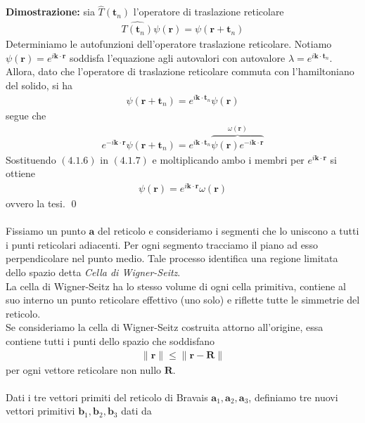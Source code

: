 \documentclass{article}
\begin{document}
\textbf{Dimostrazione:} sia $\hat{T}(\mathbf{t}_n)$ l'operatore di traslazione reticolare 
\begin{align}
    \hat{T(\mathbf{t}_n)}\psi(\mathbf{r}) = \psi(\mathbf{r} + \mathbf{t}_n) \tag{4.1.5}
\end{align}
Determiniamo le autofunzioni dell'operatore traslazione reticolare. Notiamo $\psi(\mathbf{r}) = e^{i\mathbf{k} \cdot \mathbf{r}}$ soddisfa l'equazione agli autovalori con autovalore $\lambda = e^{i\mathbf{k} \cdot \mathbf{t}_n}$. Allora, dato che l'operatore di traslazione reticolare commuta con l'hamiltoniano del solido, si ha 
\begin{align}
    \psi(\mathbf{r} + \mathbf{t}_n) = e^{i\mathbf{k} \cdot \mathbf{t}_n}\psi(\mathbf{r}) \tag{4.1.6}
\end{align}
segue che 
\begin{align}
    e^{-i\mathbf{k} \cdot \mathbf{r}}\psi(\mathbf{r} + \mathbf{t}_n) = e^{i\mathbf{k} \cdot \mathbf{t}_n}\overbrace{\psi(\mathbf{r})e^{-i\mathbf{\mathbf{k} \cdot \mathbf{r}}}}^{\omega(\mathbf{r})} \tag{4.1.7}
\end{align}
Sostituendo $(4.1.6)$ in $(4.1.7)$ e moltiplicando ambo i membri per $e^{i\mathbf{k} \cdot \mathbf{r}}$ si ottiene
\begin{align}
    \psi(\mathbf{r}) = e^{i\mathbf{k} \cdot \mathbf{r}}\omega(\mathbf{r}) \tag{4.1.8}
\end{align}
ovvero la tesi. \qed \\ \\
Fissiamo un punto $\mathbf{a}$ del reticolo e consideriamo i segmenti che lo uniscono a tutti i punti reticolari adiacenti. Per ogni segmento tracciamo il piano ad esso perpendicolare nel punto medio. Tale processo identifica una regione limitata dello spazio detta \textit{Cella di Wigner-Seitz}. \\
La cella di Wigner-Seitz ha lo stesso volume di ogni cella primitiva, contiene al suo interno un punto reticolare effettivo (uno solo) e riflette tutte le simmetrie del reticolo. \\
Se consideriamo la cella di Wigner-Seitz costruita attorno all'origine, essa contiene tutti i punti dello spazio che soddisfano 
\begin{align}
    \|\mathbf{r}\| \leq \|\mathbf{r} - \mathbf{R}\| \tag{4.1.9}
\end{align}
per ogni vettore reticolare non nullo $\mathbf{R}$. \\ \\
Dati i tre vettori primiti del reticolo di Bravais $\mathbf{a}_1, \mathbf{a}_2, \mathbf{a}_3$, definiamo tre nuovi vettori primitivi $\mathbf{b}_1, \mathbf{b}_2, \mathbf{b}_3$ dati da 
\end{document}
